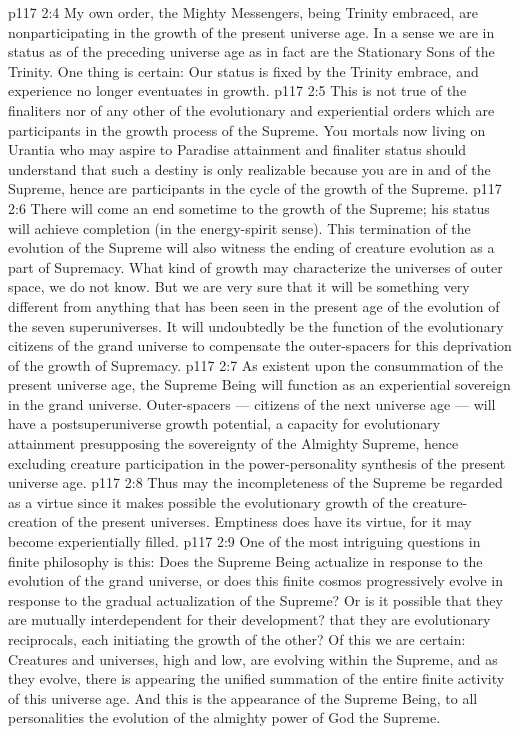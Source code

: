 \vs p117 2:4 My own order, the Mighty Messengers, being Trinity embraced, are nonparticipating in the growth of the present universe age. In a sense we are in status as of the preceding universe age as in fact are the Stationary Sons of the Trinity. One thing is certain: Our status is fixed by the Trinity embrace, and experience no longer eventuates in growth.
\vs p117 2:5 This is not true of the finaliters nor of any other of the evolutionary and experiential orders which are participants in the growth process of the Supreme. You mortals now living on Urantia who may aspire to Paradise attainment and finaliter status should understand that such a destiny is only realizable because you are in and of the Supreme, hence are participants in the cycle of the growth of the Supreme.
\vs p117 2:6 \pc There will come an end sometime to the growth of the Supreme; his status will achieve completion (in the energy\hyp{}spirit sense). This termination of the evolution of the Supreme will also witness the ending of creature evolution as a part of Supremacy. What kind of growth may characterize the universes of outer space, we do not know. But we are very sure that it will be something very different from anything that has been seen in the present age of the evolution of the seven superuniverses. It will undoubtedly be the function of the evolutionary citizens of the grand universe to compensate the outer\hyp{}spacers for this deprivation of the growth of Supremacy.
\vs p117 2:7 As existent upon the consummation of the present universe age, the Supreme Being will function as an experiential sovereign in the grand universe. Outer\hyp{}spacers --- citizens of the next universe age --- will have a postsuperuniverse growth potential, a capacity for evolutionary attainment presupposing the sovereignty of the Almighty Supreme, hence excluding creature participation in the power\hyp{}personality synthesis of the present universe age.
\vs p117 2:8 Thus may the incompleteness of the Supreme be regarded as a virtue since it makes possible the evolutionary growth of the creature\hyp{}creation of the present universes. Emptiness does have its virtue, for it may become experientially filled.
\vs p117 2:9 \pc One of the most intriguing questions in finite philosophy is this: Does the Supreme Being actualize in response to the evolution of the grand universe, or does this finite cosmos progressively evolve in response to the gradual actualization of the Supreme? Or is it possible that they are mutually interdependent for their development? that they are evolutionary reciprocals, each initiating the growth of the other? Of this we are certain: Creatures and universes, high and low, are evolving within the Supreme, and as they evolve, there is appearing the unified summation of the entire finite activity of this universe age. And this is the appearance of the Supreme Being, to all personalities the evolution of the almighty power of God the Supreme.
